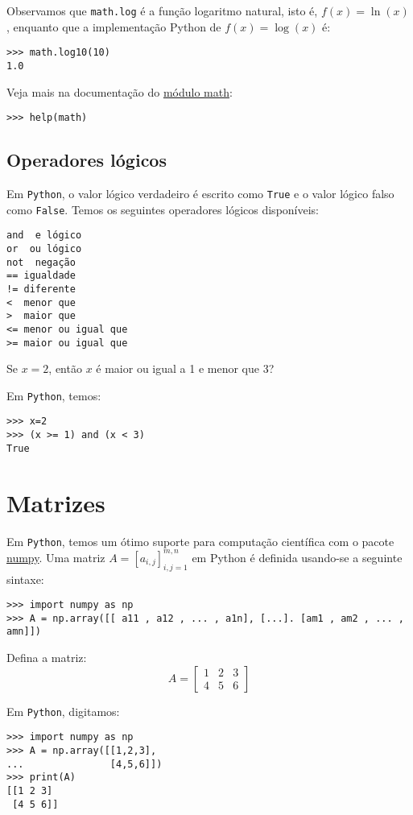 Observamos que \verb+math.log+ é a função logaritmo natural, isto é, $f(x) = \ln(x)$, enquanto que a implementação Python de $f(x) = \log(x)$ é:
\begin{verbatim}
>>> math.log10(10)
1.0
\end{verbatim}
Veja mais na documentação do \href{https://docs.python.org/3/library/math.html?highlight=math#module-math}{módulo math}:
\begin{verbatim}
>>> help(math)
\end{verbatim}

\subsection{Operadores lógicos}

Em \verb+Python+, o valor lógico verdadeiro é escrito como \verb+True+ e o valor lógico falso como \verb+False+. Temos os seguintes operadores lógicos disponíveis:
\begin{verbatim}
and  e lógico
or  ou lógico
not  negação
== igualdade
!= diferente
<  menor que
>  maior que
<= menor ou igual que
>= maior ou igual que
\end{verbatim}

\begin{ex}
  Se $x=2$, então $x$ é maior ou igual a 1 e menor que 3?
\end{ex}
\begin{sol}
  Em \verb+Python+, temos:
\begin{verbatim}
>>> x=2
>>> (x >= 1) and (x < 3)
True
\end{verbatim}
\end{sol}

\section{Matrizes}

Em \verb+Python+, temos um ótimo suporte para computação científica com o pacote \href{http://www.numpy.org/}{numpy}. Uma matriz $A = [a_{i,j}]_{i,j=1}^{m,n}$ em Python é definida usando-se a seguinte sintaxe:
\begin{verbatim}
>>> import numpy as np
>>> A = np.array([[ a11 , a12 , ... , a1n], [...]. [am1 , am2 , ... , amn]])
\end{verbatim}

\begin{ex}
  Defina a matriz:
  \begin{equation}
    A = \left[
      \begin{array}{ccc}
        1 & 2 & 3\\
        4 & 5 & 6
      \end{array}
\right]
  \end{equation}
\end{ex}
\begin{sol}
  Em \verb+Python+, digitamos:
\begin{verbatim}
>>> import numpy as np
>>> A = np.array([[1,2,3],
...               [4,5,6]])
>>> print(A)
[[1 2 3]
 [4 5 6]]
\end{verbatim}
\end{sol}

